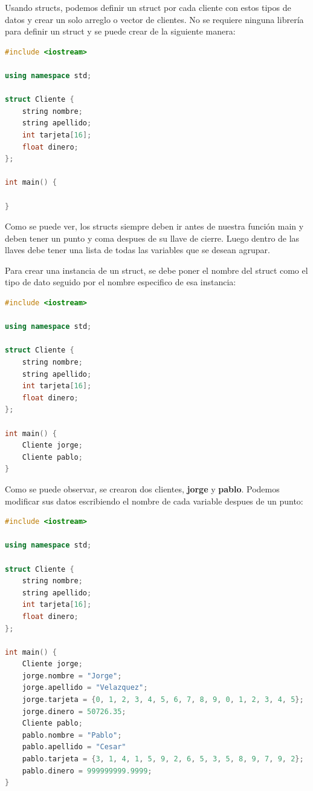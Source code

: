 \documentclass{article}
\begin{document}
Usando structs, podemos definir un struct por cada cliente con estos tipos de datos y crear un solo arreglo o vector de clientes. No se requiere ninguna librería para definir un struct y se puede crear de la siguiente manera:

\begin{lstlisting}[language=C++, caption=Definición de un struct]
#include <iostream>

using namespace std;

struct Cliente {
    string nombre;
    string apellido;
    int tarjeta[16];
    float dinero;
};

int main() {

}
\end{lstlisting}

Como se puede ver, los structs siempre deben ir antes de nuestra función main y deben tener un punto y coma despues de su llave de cierre. Luego dentro de las llaves debe tener una lista de todas las variables que se desean agrupar.

Para crear una instancia de un struct, se debe poner el nombre del struct como el tipo de dato seguido por el nombre especifico de esa instancia:

\begin{lstlisting}[language=C++, caption=Instanciamiento]
#include <iostream>

using namespace std;

struct Cliente {
    string nombre;
    string apellido;
    int tarjeta[16];
    float dinero;
};

int main() {
    Cliente jorge;
    Cliente pablo;
}
\end{lstlisting}

Como se puede observar, se crearon dos clientes, \textbf{jorge} y \textbf{pablo}. Podemos modificar sus datos escribiendo el nombre de cada variable despues de un punto:

\begin{lstlisting}[language=C++, caption=Modificando valores]
#include <iostream>

using namespace std;

struct Cliente {
    string nombre;
    string apellido;
    int tarjeta[16];
    float dinero;
};

int main() {
    Cliente jorge;
    jorge.nombre = "Jorge";
    jorge.apellido = "Velazquez";
    jorge.tarjeta = {0, 1, 2, 3, 4, 5, 6, 7, 8, 9, 0, 1, 2, 3, 4, 5};
    jorge.dinero = 50726.35;
    Cliente pablo;
    pablo.nombre = "Pablo";
    pablo.apellido = "Cesar"
    pablo.tarjeta = {3, 1, 4, 1, 5, 9, 2, 6, 5, 3, 5, 8, 9, 7, 9, 2};
    pablo.dinero = 999999999.9999;
}
\end{lstlisting}
\end{document}
